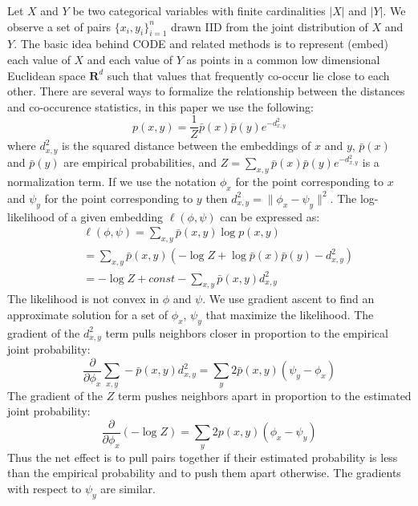 \documentclass[11pt]{article}
\begin{document}
Let $X$ and $Y$ be two categorical variables with finite cardinalities
$|X|$ and $|Y|$.  We observe a set of pairs $\{x_i, y_i\}_{i=1}^n$
drawn IID from the joint distribution of $X$ and $Y$.  The basic idea
behind CODE and related methods is to represent (embed) each value of
$X$ and each value of $Y$ as points in a common low dimensional
Euclidean space $\mathbf{R}^d$ such that values that frequently
co-occur lie close to each other.  There are several ways to formalize
the relationship between the distances and co-occurence statistics, in
this paper we use the following:
\begin{equation} \label{eq:probability}
p(x,y) = \frac{1}{Z} \bar{p}(x) \bar{p}(y) e^{-d^2_{x,y}}
\end{equation}
\noindent where $d^2_{x,y}$ is the squared distance between the
embeddings of $x$ and $y$, $\bar{p}(x)$ and $\bar{p}(y)$ are empirical
probabilities, and $Z=\sum_{x,y} \bar{p}(x) \bar{p}(y) e^{-d^2_{x,y}}$ is
a normalization term.  If we use the notation $\phi_x$ for the
point corresponding to $x$ and $\psi_y$ for the point corresponding
to $y$ then $d^2_{x,y} = \|\phi_x-\psi_y\|^2$.  The log-likelihood
of a given embedding $\ell(\phi, \psi)$ can be expressed as:
\begin{eqnarray} 
&&\ell(\phi, \psi) = \sum_{x,y} \bar{p}(x,y) \log p(x,y) \label{eq:likelihood} \\
&&= \sum_{x,y} \bar{p}(x,y) (-\log Z + \log \bar{p}(x)\bar{p}(y) - d^2_{x,y}) \nonumber \\
&&= -\log Z + \mathit{const} - \sum_{x,y} \bar{p}(x,y) d^2_{x,y} \nonumber
\end{eqnarray}
The likelihood is not convex in $\phi$ and $\psi$.  We use gradient
ascent to find an approximate solution for a set of $\phi_x$, $\psi_y$
that maximize the likelihood.  The gradient of the $d^2_{x,y}$ term
pulls neighbors closer in proportion to the empirical joint
probability:
\begin{equation}
\frac{\partial}{\partial\phi_x} \sum_{x,y} -\bar{p}(x,y) d^2_{x,y} =
\sum_y 2 \bar{p}(x,y) (\psi_y - \phi_x) \label{eq:attract}
\end{equation}
The gradient of the $Z$ term pushes neighbors apart in proportion to the
estimated joint probability:
\begin{equation}
\frac{\partial}{\partial\phi_x} (-\log Z) = \sum_y 2 p(x,y) (\phi_x -
\psi_y) \label{eq:repulse}
\end{equation}
Thus the net effect is to pull pairs together if their estimated
probability is less than the empirical probability and to push them
apart otherwise.  The gradients with respect to $\psi_y$ are
similar.
\end{document}
